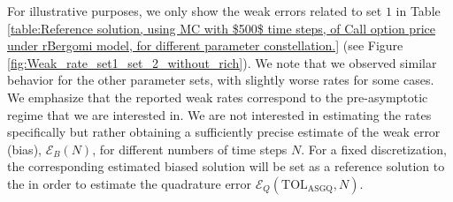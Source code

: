 For illustrative purposes, we only show the weak errors related to set $1$ in Table \ref{table:Reference solution, using MC with $500$ time steps, of Call option price under rBergomi model, for different parameter constellation.} (see Figure \ref{fig:Weak_rate_set1_set_2_without_rich}). We note that we observed similar behavior for the other parameter sets, with slightly worse rates for some cases. We emphasize that the reported weak rates correspond to the pre-asymptotic regime that we are interested in. We are not interested in estimating the rates specifically but rather obtaining  a sufficiently precise estimate of the weak error (bias), $\mathcal{E}_B(N)$, for different  numbers of time steps $N$.  For a fixed discretization, the corresponding estimated biased solution will be set as a reference solution to the    in order to estimate the quadrature error $\mathcal{E}_Q(\text{TOL}_{\text{ASGQ}},N)$.	
\FloatBarrier
